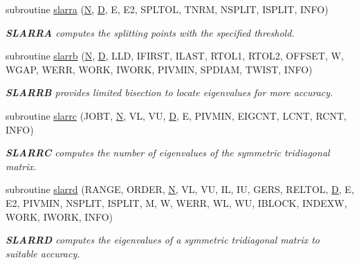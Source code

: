 \begin{DoxyCompactItemize}
subroutine \hyperlink{group__auxOTHERauxiliary_ga4f440e7139c504926241c9f7f71332d2}{slarra} (\hyperlink{polmisc_8c_a0240ac851181b84ac374872dc5434ee4}{N}, \hyperlink{odrpack_8h_a7dae6ea403d00f3687f24a874e67d139}{D}, E, E2, S\+P\+L\+T\+O\+L, T\+N\+R\+M, N\+S\+P\+L\+I\+T, I\+S\+P\+L\+I\+T, I\+N\+F\+O)
\begin{DoxyCompactList}\small\item\em {\bfseries S\+L\+A\+R\+R\+A} computes the splitting points with the specified threshold. \end{DoxyCompactList}\item 
subroutine \hyperlink{group__auxOTHERauxiliary_gad29562cff63b75a1f3f40e7f83aea2b7}{slarrb} (\hyperlink{polmisc_8c_a0240ac851181b84ac374872dc5434ee4}{N}, \hyperlink{odrpack_8h_a7dae6ea403d00f3687f24a874e67d139}{D}, L\+L\+D, I\+F\+I\+R\+S\+T, I\+L\+A\+S\+T, R\+T\+O\+L1, R\+T\+O\+L2, O\+F\+F\+S\+E\+T, W, W\+G\+A\+P, W\+E\+R\+R, W\+O\+R\+K, I\+W\+O\+R\+K, P\+I\+V\+M\+I\+N, S\+P\+D\+I\+A\+M, T\+W\+I\+S\+T, I\+N\+F\+O)
\begin{DoxyCompactList}\small\item\em {\bfseries S\+L\+A\+R\+R\+B} provides limited bisection to locate eigenvalues for more accuracy. \end{DoxyCompactList}\item 
subroutine \hyperlink{group__auxOTHERauxiliary_ga3895a010b624d4185e3c0c60b3cf1196}{slarrc} (J\+O\+B\+T, \hyperlink{polmisc_8c_a0240ac851181b84ac374872dc5434ee4}{N}, V\+L, V\+U, \hyperlink{odrpack_8h_a7dae6ea403d00f3687f24a874e67d139}{D}, E, P\+I\+V\+M\+I\+N, E\+I\+G\+C\+N\+T, L\+C\+N\+T, R\+C\+N\+T, I\+N\+F\+O)
\begin{DoxyCompactList}\small\item\em {\bfseries S\+L\+A\+R\+R\+C} computes the number of eigenvalues of the symmetric tridiagonal matrix. \end{DoxyCompactList}\item 
subroutine \hyperlink{group__auxOTHERauxiliary_ga137b773fc78098f8177b09e7d6dc3c91}{slarrd} (R\+A\+N\+G\+E, O\+R\+D\+E\+R, \hyperlink{polmisc_8c_a0240ac851181b84ac374872dc5434ee4}{N}, V\+L, V\+U, I\+L, I\+U, G\+E\+R\+S, R\+E\+L\+T\+O\+L, \hyperlink{odrpack_8h_a7dae6ea403d00f3687f24a874e67d139}{D}, E, E2, P\+I\+V\+M\+I\+N, N\+S\+P\+L\+I\+T, I\+S\+P\+L\+I\+T, M, W, W\+E\+R\+R, W\+L, W\+U, I\+B\+L\+O\+C\+K, I\+N\+D\+E\+X\+W, W\+O\+R\+K, I\+W\+O\+R\+K, I\+N\+F\+O)
\begin{DoxyCompactList}\small\item\em {\bfseries S\+L\+A\+R\+R\+D} computes the eigenvalues of a symmetric tridiagonal matrix to suitable accuracy. \end{DoxyCompactList}\item 

\end{DoxyCompactItemize}
